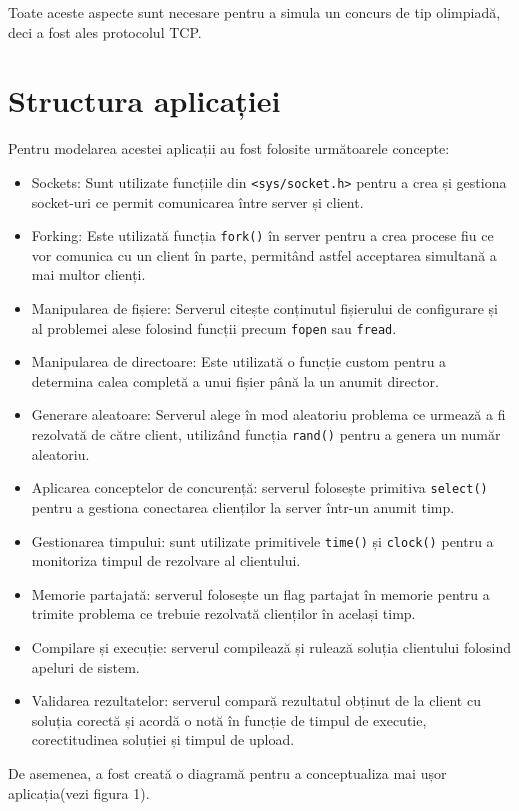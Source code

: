 \documentclass[runningheads]{llncs}
\begin{document}
Toate aceste aspecte sunt necesare pentru a simula un concurs de tip olimpiadă, deci a fost ales protocolul TCP.
\section{Structura aplicației}
Pentru modelarea acestei aplicații au fost folosite următoarele concepte:
\begin{itemize}
    \item Sockets: Sunt utilizate funcțiile din \texttt{<sys/socket.h>} pentru a crea și gestiona socket-uri ce permit comunicarea între server și client.
    \item Forking: Este utilizată funcția \texttt{fork()} în server pentru a crea procese fiu ce vor comunica cu un client în parte, permitând astfel acceptarea simultană a mai multor clienți.
    \item Manipularea de fișiere: Serverul citește conținutul fișierului de configurare și al problemei alese folosind funcții precum \texttt{fopen} sau \texttt{fread}.
    \item Manipularea de directoare: Este utilizată o funcție custom pentru a determina calea completă a unui fișier până la un anumit director.
    \item Generare aleatoare: Serverul alege în mod aleatoriu problema ce urmează a fi rezolvată de către client, utilizând funcția \texttt{rand()} pentru a genera un număr aleatoriu.
    \item Aplicarea conceptelor de concurență: serverul folosește primitiva \texttt{select()} pentru a gestiona conectarea clienților la server într-un anumit timp.
    \item Gestionarea timpului: sunt utilizate primitivele \texttt{time()} și \texttt{clock()} pentru a monitoriza timpul de rezolvare al clientului.
    \item Memorie partajată: serverul folosește un flag partajat în memorie pentru a trimite problema ce trebuie rezolvată clienților în același timp.
    \item Compilare și execuție: serverul compilează și rulează soluția clientului folosind apeluri de sistem.
    \item Validarea rezultatelor: serverul compară rezultatul obținut de la client cu soluția corectă și acordă o notă în funcție de timpul de executie, corectitudinea soluției și timpul de upload.
\end{itemize}
\hspace{1em} De asemenea, a fost creată o diagramă pentru a conceptualiza mai ușor aplicația(vezi figura 1).
\end{document}
